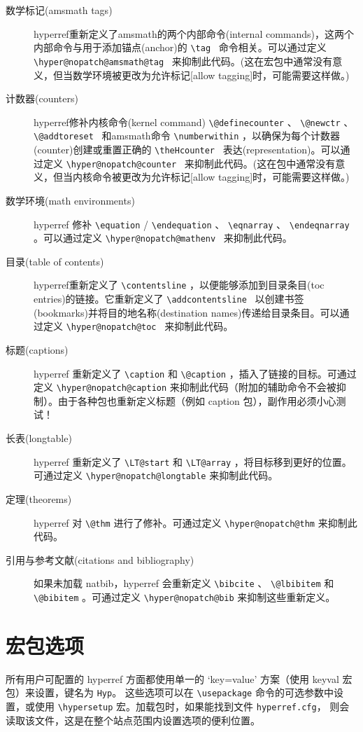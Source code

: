 \documentclass{article}
\newcommand*{\cs}[1]{%
  \texttt{\textbackslash #1}%
}
\newcommand*{\xpackage}[1]{\textsf{#1}}
\begin{document}
\begin{description}
  \item[数学标记(amsmath tags)] \xpackage{hyperref}重新定义了amsmath的两个内部命令(internal commands)，这两个内部命令与用于添加锚点(anchor)的 \cs{tag}\ 命令相关。可以通过定义 \cs{hyper@nopatch@amsmath@tag}\ 来抑制此代码。(这在宏包中通常没有意义，但当数学环境被更改为允许标记[allow tagging]时，可能需要这样做。)
  \item[计数器(counters)] \xpackage{hyperref}修补内核命令(kernel command) \cs{@definecounter}、\cs{@newctr}、\cs{@addtoreset}\ 和amsmath命令 \cs{numberwithin}，以确保为每个计数器(counter)创建或重置正确的 \cs{theHcounter}\ 表达(representation)。可以通过定义 \cs{hyper@nopatch@counter}\ 来抑制此代码。(这在包中通常没有意义，但当内核命令被更改为允许标记[allow tagging]时，可能需要这样做。)
  \item[数学环境(math environments)] \xpackage{hyperref} 修补 \cs{equation}/\cs{endequation}、\cs{eqnarray}、\cs{endeqnarray}。可以通过定义 \cs{hyper@nopatch@mathenv}\ 来抑制此代码。
  \item[目录(table of contents)] \xpackage{hyperref}重新定义了 \cs{contentsline}，以便能够添加到目录条目(toc entries)的链接。它重新定义了 \cs{addcontentsline}\ 以创建书签(bookmarks)并将目的地名称(destination names)传递给目录条目。可以通过定义 \cs{hyper@nopatch@toc}\ 来抑制此代码。
  \item[标题(captions)] \xpackage{hyperref} 重新定义了 \cs{caption} 和 \cs{@caption}，插入了链接的目标。可通过定义 \cs{hyper@nopatch@caption} 来抑制此代码（附加的辅助命令不会被抑制）。由于各种包也重新定义标题（例如 \xpackage{caption} 包），副作用必须小心测试！
  \item[长表(longtable)] \xpackage{hyperref} 重新定义了 \cs{LT@start} 和 \cs{LT@array}，将目标移到更好的位置。可通过定义 \cs{hyper@nopatch@longtable} 来抑制此代码。
  \item[定理(theorems)] \xpackage{hyperref} 对 \cs{@thm} 进行了修补。可通过定义 \cs{hyper@nopatch@thm} 来抑制此代码。
  \item[引用与参考文献(citations and bibliography)] 如果未加载 \xpackage{natbib}，\xpackage{hyperref} 会重新定义 \cs{bibcite}、\cs{@lbibitem} 和 \cs{@bibitem}。可通过定义 \cs{hyper@nopatch@bib} 来抑制这些重新定义。
\end{description}

\newpage
\section{\heiti 宏包选项}

所有用户可配置的 \xpackage{hyperref} 方面都使用单一的 `key=value'
方案（使用 \xpackage{keyval} 宏包）来设置，键名为 \texttt{Hyp}。
这些选项可以在 \cs{usepackage} 命令的可选参数中设置，或使用
\cs{hypersetup} 宏。加载包时，如果能找到文件 \texttt{hyperref.cfg}，
则会读取该文件，这是在整个站点范围内设置选项的便利位置。
\end{document}
